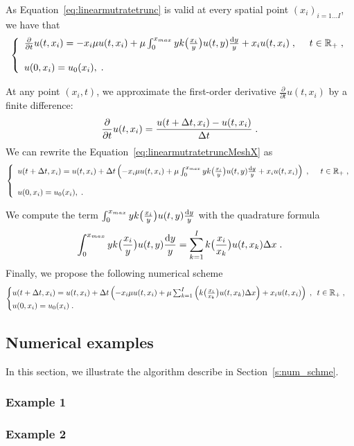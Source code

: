 \documentclass[11pt]{amsart}
\begin{document}
As Equation~\eqref{eq:linearmutratetrunc} is valid at every spatial point $(x_i)_{i = 1 \ldots I}$, we have that
\begin{equation}\left\{
    \begin{array}{ll}
	\frac{\partial}{\partial t}u(t,x_i) = - x_i\mu u(t,x_i) + \mu \int_{0}^{x_{max}} y k\big( \frac{x_i}{y}\big) u(t,y) \frac{\mathrm dy}{y} + x_iu(t,x_i)
	\; , \enspace
	& t \in \mathbb{R}_+ \; ,
	\\ \\
	u(0, x_i) = u_0(x_i),
	\; .
    \end{array}
	\right.
    \label{eq:linearmutratetruncMeshX}
\end{equation}


At any point $(x_i, t)$, we approximate the first-order derivative $\frac{\partial}{\partial t}u(t,x_i)$ by a finite difference:
$$\frac{\partial}{\partial t}u(t,x_i) = \frac{u(t+\Delta t,x_i) - u(t,x_i)}{\Delta t}
\; .$$
We can rewrite the Equation~\eqref{eq:linearmutratetruncMeshX} as
\begin{equation}\left\{
    \begin{array}{ll}
        u(t+\Delta t,x_i) = u(t,x_i) + \Delta t \left(- x_i\mu u(t,x_i) + \mu \int_{0}^{x_{max}} y k\big( \frac{x_i}{y}\big) u(t,y) \frac{\mathrm dy}{y} + x_iu(t,x_i) \right)
	\; , \enspace
	& t \in \mathbb{R}_+ \; ,
	\\ \\
	u(0, x_i) = u_0(x_i),
	\; .
    \end{array}
	\right.
    \label{eq:linearmutratetruncMeshX}
\end{equation}

We compute the term $\int_{0}^{x_{max}} y k\big( \frac{x_i}{y}\big) u(t,y) \frac{\mathrm dy}{y}$ with the quadrature formula
$$ \int_{0}^{x_{max}} y k\big( \frac{x_i}{y}\big) u(t,y) \frac{\mathrm dy}{y}
= \sum_{k = 1}^I k \big( \frac{x_i}{x_k}\big) u(t,x_k) \Delta x \; .
$$ 
Finally, we propose the following numerical scheme
\begin{equation}
    \begin{cases}
    u(t+\Delta t,x_i) = u(t,x_i) + \Delta t \left(- x_i\mu u(t,x_i) + \mu \sum_{k = 1}^I \left(k \big( \frac{x_i}{x_k}\big) u(t,x_k) \Delta x \right) + x_iu(t,x_i) \right)
	\; , \enspace
	 t \in \mathbb{R}_+ \; ,
     \\
	u(0, x_i) = u_0(x_i)
    \; .
    \end{cases}
    \label{eq:numericalScheme}
\end{equation}

\subsection{Numerical examples} \mbox{}

In this section, we illustrate the algorithm describe in Section~\ref{s:num_schme}. 
\subsubsection{Example 1}
\subsubsection{Example 2}




\end{document}
